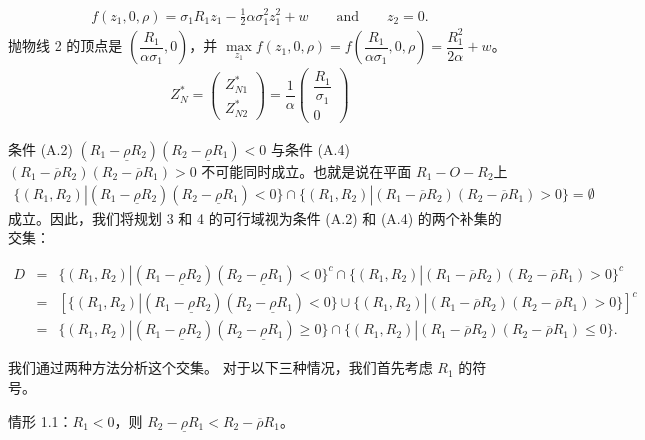 \documentclass[10.0pt]{article}
\begin{document}
\begin{eqnarray*}
f (z_1, 0, \rho) = \sigma_1 R_1 z_1 - \frac12 \alpha \sigma_1^2 z_1^2 + w \qquad \text{and} \qquad z_2 = 0.
\end{eqnarray*}
抛物线 2 的顶点是 $ \left( \dfrac{R_1}{\alpha \sigma_1}, 0 \right) $，并 $ \max\limits_{z_1} f (z_1, 0, \rho) = f \left( \dfrac{R_1}{\alpha \sigma_1}, 0, \rho \right) =\dfrac{R_1^2} {2 \alpha} + w $。
\begin{eqnarray}
Z_N^* = \left( \begin{matrix} Z_{N 1}^* \\ Z_{N 2}^* \end{matrix} \right) = \dfrac1{\alpha} \left( \begin{matrix} \dfrac{R_1}{\sigma_1} \\ 0 \end{matrix} \right)
\end{eqnarray}

条件 (A.2) $ (R_1 - \underline{\rho} R_2) (R_2 - \underline{\rho} R_1) < 0 $ 与条件 (A.4) $ (R_1 - \overline{ \rho} R_2) (R_2 - \overline{\rho} R_1) > 0 $ 不可能同时成立。也就是说在平面 $ R_1 - O - R_2 $上
\begin{eqnarray*}
\{ (R_1, R_2) | (R_1 - \underline{\rho} R_2) (R_2 - \underline{\rho} R_1) < 0 \} \cap \{ (R_1, R_2) | (R_1 - \overline{\rho} R_2) (R_2 - \overline{\rho} R_1) > 0 \} = \emptyset
\end{eqnarray*}
成立。因此，我们将规划 3 和 4 的可行域视为条件 (A.2) 和 (A.4) 的两个补集的交集：

\begin{eqnarray*}
D & = & \{ (R_1, R_2) | (R_1 - \underline{\rho} R_2) (R_2 - \underline{\rho} R_1) < 0 \}^c \cap \{ (R_1, R_2) | (R_1 - \overline{\rho} R_2) (R_2 - \overline{\rho} R_1) > 0 \}^c \\
& = & \left[ \{ (R_1, R_2) | (R_1 - \underline{\rho} R_2) (R_2 - \underline{\rho} R_1) < 0 \} \cup \{ (R_1, R_2) | (R_1 - \overline{\rho} R_2) (R_2 - \overline{\rho} R_1) > 0 \} \right]^c \\
& = & \{ (R_1, R_2) | (R_1 - \underline{\rho} R_2) (R_2 - \underline{\rho} R_1) \geqslant 0 \} \cap \{ (R_1, R_2) | (R_1 - \overline{\rho} R_2) (R_2 - \overline{\rho} R_1) \leqslant 0 \}.
\end{eqnarray*}


我们通过两种方法分析这个交集。 对于以下三种情况，我们首先考虑 $R_1$ 的符号。


情形 1.1：$ R_1 < 0 $，则 $ R_2 - \underline{\rho} R_1 < R_2 - \overline{\rho} R_1 $。
\end{document}
